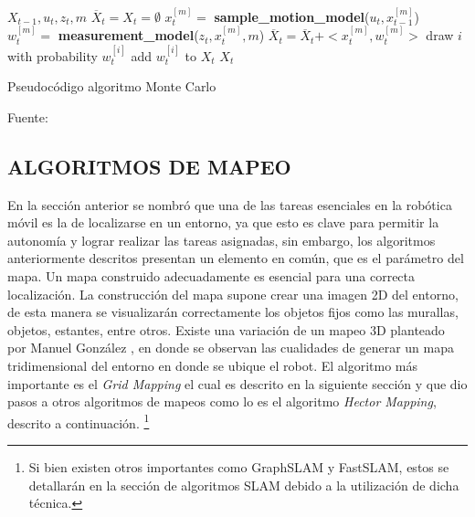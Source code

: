 \begin{algorithm}[H]
\centering
    \begin{algorithmic}[1]
        \Require $X_{t-1}, u_{t}, z_{t}, m$
        \vspace{1mm}
        \hline
        \vspace{1mm}
        \State $\overline{X}_{t} = X_{t} = \emptyset$
           \State $x_{t}^{[m]} =  $\textbf{ sample\_motion\_model}($u_{t}, x_{t-1}^{[m]} $)
           \State $w_{t}^{[m]} = $\textbf{ measurement\_model}($z_{t}, x_{t}^{[m]}, m $)
           \State $\overline{X}_{t} = \overline{X}_{t} + <x_{t}^{[m]}, w_{t}^{[m]}>$
           \EndFor
           \State draw $i$ with probability \infty  $ w_{t}^{[i]}$
           \State add $w_{t}^{[i]}$ to $X_{t}$
           \EndFor
        \State \Return $X_{t}$
        \vspace{1mm}
        \hline
        \vspace{1mm}
    \end{algorithmic}
\caption{Pseudocódigo algoritmo Monte Carlo}
Fuente: \cite{thrun_probabilistic_2005}
\label{alg:Algoritmo_Monte_Carlo}
\end{algorithm}

\newpage
\subsection{ALGORITMOS DE MAPEO}
En la sección anterior se nombró que una de las tareas esenciales en la robótica móvil es la de localizarse en un entorno, ya que esto es clave para permitir la autonomía y lograr realizar las tareas asignadas, sin embargo, los algoritmos anteriormente descritos presentan un elemento en común, que es el parámetro del mapa. Un mapa construido adecuadamente es esencial para una correcta localización. La construcción del mapa supone crear una imagen 2D del entorno, de esta manera se visualizarán correctamente los objetos fijos como las murallas, objetos, estantes, entre otros. Existe una variación de un mapeo 3D planteado por Manuel González \cite{dos_reis_quantitative_2019}, en donde se observan las cualidades de generar un mapa tridimensional del entorno en donde se ubique el robot. El algoritmo más importante es el \textit{Grid Mapping} el cual es descrito en la siguiente sección y que dio pasos a otros algoritmos de mapeos como lo es el algoritmo \textit{Hector Mapping}, descrito a continuación. \footnote{Si bien existen otros importantes como GraphSLAM y FastSLAM, estos se detallarán en la sección de algoritmos SLAM debido a la utilización de dicha técnica.}

